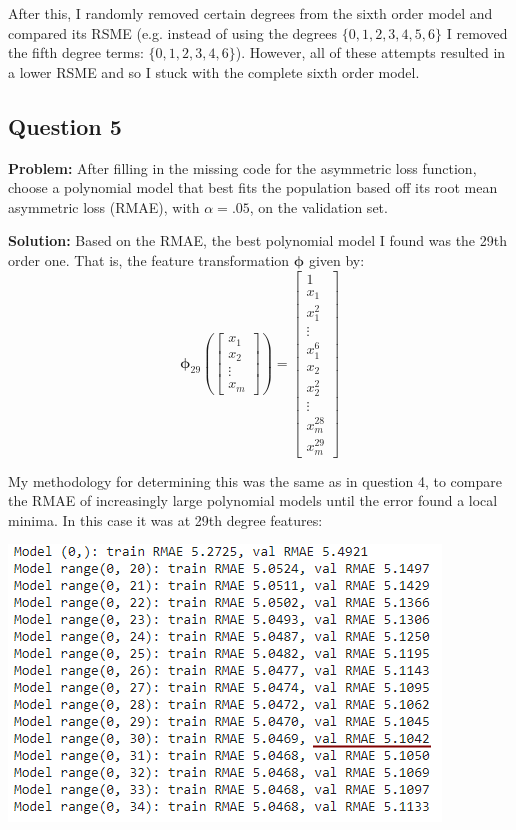 \documentclass{article}
\begin{document}
After this, I randomly removed certain degrees from the sixth order model and compared its RSME (e.g. instead of using the degrees $\{0,1,2,3,4,5,6\}$ I removed the fifth degree terms: $\{0,1,2,3,4,6\}$). However, all of these attempts resulted in a lower RSME and so I stuck with the complete sixth order model.

\subsection*{Question 5}
\noindent\textbf{Problem:} After filling in the missing code for the asymmetric loss function, choose a polynomial model that best fits the population based off its root mean asymmetric loss (RMAE), with $\alpha=.05$, on the validation set.
\bigskip

\noindent\textbf{Solution:} Based on the RMAE, the best polynomial model I found was the 29th order one. That is, the feature transformation $\bm{\phi}$ given by:
$$\bm{\phi}_{29}\left(\begin{bmatrix}
    x_{1} \\
    x_{2} \\
    \vdots \\
    x_{m}
  \end{bmatrix}\right)=\begin{bmatrix}
    1\\
    x_{1} \\
    x_{1}^2 \\
    \vdots \\
    x_{1}^6 \\
    x_{2} \\
    x_{2}^2 \\
    \vdots \\
    x_{m}^{28}\\
    x_{m}^{29}
  \end{bmatrix}$$
\bigskip

My methodology for determining this was the same as in question 4, to compare the RMAE of increasingly large polynomial models until the error found a local minima. In this case it was at 29th degree features:
\begin{center}
    \includegraphics[scale=.95]{fig2.png}
\end{center}
\end{document}
